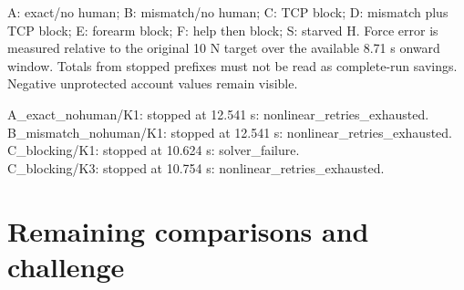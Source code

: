 \documentclass[10pt,letterpaper]{article}
\begin{document}
A: exact/no human; B: mismatch/no human; C: TCP block; D: mismatch plus TCP block; E: forearm block; F: help then block; S: starved H. Force error is measured relative to the original 10 N target over the available 8.71 s onward window. Totals from stopped prefixes must not be read as complete-run savings. Negative unprotected account values remain visible.\par
A\_exact\_nohuman/K1: stopped at 12.541 s: nonlinear\_retries\_exhausted.\\
B\_mismatch\_nohuman/K1: stopped at 12.541 s: nonlinear\_retries\_exhausted.\\
C\_blocking/K1: stopped at 10.624 s: solver\_failure.\\
C\_blocking/K3: stopped at 10.754 s: nonlinear\_retries\_exhausted.\\
\clearpage\section*{Remaining comparisons and challenge}
\end{document}
